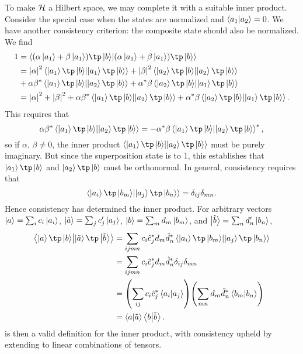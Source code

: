 \documentclass[../thesis.tex]{subfiles}
\begin{document}
To make $\mathcal{H}$ a Hilbert space, we may complete it with a suitable inner
product. Consider the special case when the states are normalized and
$\ip{a_1}{a_2} = 0$. We have another consistency criterion: the composite state
should also be normalized. We find
\begin{align}
  1
  &= \ip{\qty(\alpha\ket{a_1} + \beta\ket{a_1}) \tp \ket{b}}{%
  \qty(\alpha\ket{a_1} + \beta\ket{a_1}) \tp \ket{b}} \\
  &= \abs{\alpha}^2 \ip{\ket{a_1} \tp \ket{b}}{\ket{a_1} \tp \ket{b}}
  + \abs{\beta}^2 \ip{\ket{a_2} \tp \ket{b}}{\ket{a_2} \tp \ket{b}} \\
  &+ \alpha\beta^* \ip{\ket{a_1} \tp \ket{b}}{\ket{a_2} \tp \ket{b}}
  + \alpha^*\beta \ip{\ket{a_2} \tp \ket{b}}{\ket{a_1} \tp \ket{b}} \\
  &= \abs{\alpha}^2 + \abs{\beta}^2
  + \alpha\beta^* \ip{\ket{a_1} \tp \ket{b}}{\ket{a_2} \tp \ket{b}}
  + \alpha^*\beta \ip{\ket{a_2} \tp \ket{b}}{\ket{a_1} \tp \ket{b}}.
\end{align}
This requires that
\begin{equation}
  \alpha\beta^* \ip{\ket{a_1} \tp \ket{b}}{\ket{a_2} \tp \ket{b}}
  = -\alpha^*\beta \ip{\ket{a_1} \tp \ket{b}}{\ket{a_2} \tp \ket{b}}^*,
\end{equation}
so if $\alpha$, $\beta \neq 0$, the inner product $\ip{\ket{a_1} \tp
\ket{b}}{\ket{a_2} \tp \ket{b}}$ must be purely imaginary. But since the
superposition state is to 1, this establishes that $\ket{a_1} \tp \ket{b}$ and
$\ket{a_2} \tp \ket{b}$ must be orthonormal. In general, consistency requires
that
\begin{equation}
  \ip{\ket{a_i} \tp \ket{b_m}}{\ket{a_j} \tp \ket{b_n}}
  = \delta_{ij}\delta_{mn}.
\end{equation}
Hence consistency has determined the inner product. For arbitrary vectors
$\ket{a} = \sum_i c_i \ket{a_i}$, $\ket{\tilde{a}} = \sum_j c_j' \ket{a_j}$,
$\ket{b} = \sum_m d_m \ket{b_m}$, and $\ket{\tilde{b}} = \sum_n d_n' \ket{b_n}$,
\begin{align}
  \ip{\ket{a} \tp \ket{b}}{\ket{\tilde a} \tp \ket{\tilde b}}
  &= \sum_{ijmn} c_i \tilde{c}_j^* d_m \tilde{d}_n^*
  \ip{\ket{a_i} \tp \ket{b_m}}{\ket{a_j} \tp \ket{b_n}}
  \\
  &= \sum_{ijmn} c_i \tilde{c}_j^* d_m \tilde{d}_n^*
  \delta_{ij}\delta_{mn}
  \\
  &= \qty(\sum_{ij} c_i \tilde{c}_j^* \ip{a_i}{a_j})
  \qty(\sum_{mn} d_m \tilde{d}_n^* \ip{b_m}{b_n})
  \\
  &= \ip{a}{\tilde{a}} \ip{b}{\tilde{b}}.
  \label{eq:composite-ip}
\end{align}
 is then a valid definition for the inner product, with
consistency upheld by extending to linear combinations of tensors.
\end{document}

